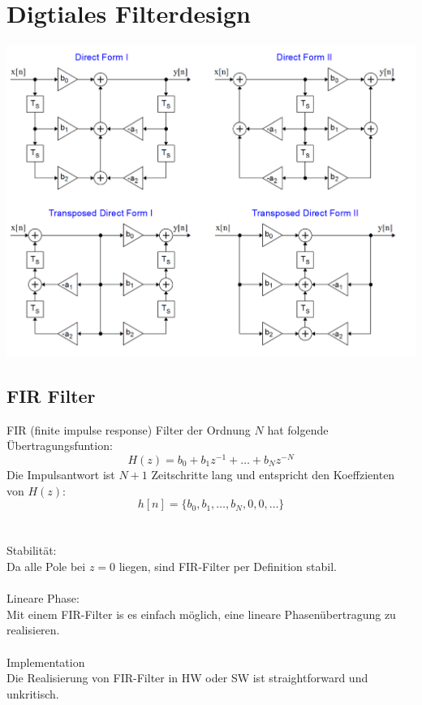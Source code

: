 



\chapter{Digtiales Filterdesign}
\begin{center}
	\includegraphics[scale=.8]{./images/lti_scheme}
\end{center}
\section{FIR Filter}
FIR (finite impulse response) Filter der Ordnung $N$ hat folgende
Übertragungsfuntion:
\[ H(z) =b_0 + b_1z^{-1} + \ldots + b_Nz^{-N} \]
Die Impulsantwort ist $N+1$ Zeitschritte lang und entspricht den Koeffzienten
von $H(z)$:
\[ h[n] = \{ b_0,b_1,\ldots,b_N,0,0,\ldots \} \]\\
\\
\textrm{Stabilität:}\\
Da alle Pole bei $z=0$ liegen, sind FIR-Filter per Definition stabil.\\
\\
\textrm{Lineare Phase:}\\
Mit einem FIR-Filter is es einfach möglich, eine lineare Phasenübertragung
zu realisieren.\\
\\
\textrm{Implementation}\\
Die Realisierung von FIR-Filter in HW oder SW ist straightforward und unkritisch.

